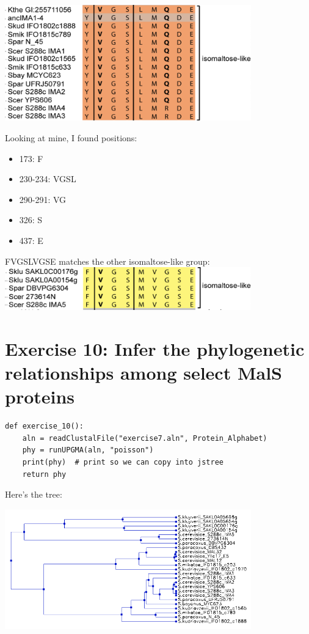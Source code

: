 \documentclass{article} %
\begin{document}
\includegraphics[width=0.8\textwidth]{mine.png}

\par Looking at mine, I found positions: \\

\begin{itemize}
    \item 173: F
    \item 230-234: VGSL
    \item 290-291: VG
    \item 326: S
    \item 437: E
\end{itemize}

FVGSLVGSE matches the other isomaltose-like group: \\

\includegraphics[width=0.8\textwidth]{ima1.png}

\section{Exercise 10: Infer the phylogenetic relationships among select MalS proteins}

\begin{verbatim}
def exercise_10():
    aln = readClustalFile("exercise7.aln", Protein_Alphabet)
    phy = runUPGMA(aln, "poisson")
    print(phy)  # print so we can copy into jstree
    return phy
\end{verbatim}

Here's the tree:

\includegraphics[width=0.8\textwidth]{tree.png}
\end{document}
